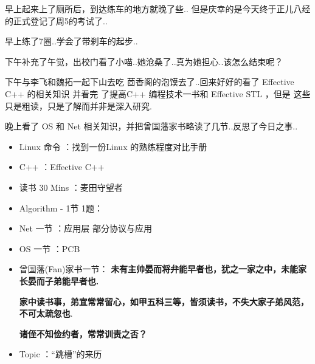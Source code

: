 \documentclass[UTF8,a4paper,8pt]{ctexart}
\begin{document}
	 	 早上起来上了厕所后，到达练车的地方就晚了些.. 但是庆幸的是今天终于正儿八经的正式登记了周5的考试了..
	 	 
	 	 早上练了7圈..学会了带刹车的起步..
	 	 
	 	 下午补充了午觉，出校门看了小喵..她沧桑了..真为她担心..该怎么结束呢？
	 	 
	 	 下午与李飞和魏拓一起下山去吃 茴香阁的泡馍去了..回来好好的看了 Effective C++ 的相关知识 并看完 了提高C++ 编程技术一书和 Effective STL 
	 	 ，但是 这些只是粗读，只是了解而并非是深入研究.
	 	 
	 	 晚上看了 OS 和 Net 相关知识，并把曾国藩家书略读了几节..反思了今日之事..
	 	 \begin{itemize}
	 	 	\item  \makebox[0pt][l]{$\square$}\raisebox{.15ex}{\hspace{0.1em}$\checkmark$} Linux 命令 ：找到一份Linux 的熟练程度对比手册
	 	 	\item  \makebox[0pt][l]{$\square$}\raisebox{.15ex}{\hspace{0.1em}$\checkmark$} C++ ：Effective C++
	 	 	
	 	 	\item  \makebox[0pt][l]{$\square$}\raisebox{.15ex}{\hspace{0.1em}$\checkmark$} 读书  30 Mins	：麦田守望者	 	 
	 	 	\item  \makebox[0pt][l]{$\square$}\hspace{1em} Algorithm - 1节 1题：
	 	 	\item  \makebox[0pt][l]{$\square$}\raisebox{.15ex}{\hspace{0.1em}$\checkmark$} Net 一节 ：应用层 部分协议与应用
	 	 	\item  \makebox[0pt][l]{$\square$}\raisebox{.15ex}{\hspace{0.1em}$\checkmark$} OS  一节 ：PCB
	 	 	
	 	 	\item  \makebox[0pt][l]{$\square$}\raisebox{.15ex}{\hspace{0.1em}$\checkmark$} 曾国藩(Fan)家书一节： \textbf{未有主帅晏而将弁能早者也，犹之一家之中，未能家长晏而子弟能早者也.} 
	 	 	
	 	 	\textbf{家中读书事，弟宜常常留心，如甲五科三等，皆须读书，不失大家子弟风范，不可太疏忽也}.
	 	 	
	 	 	\textbf{诸侄不知俭约者，常常训责之否？}
	 	 	\item  \makebox[0pt][l]{$\square$}\raisebox{.15ex}{\hspace{0.1em}$\checkmark$} Topic ：“跳槽”的来历
	 	 \end{itemize}
\end{document}
